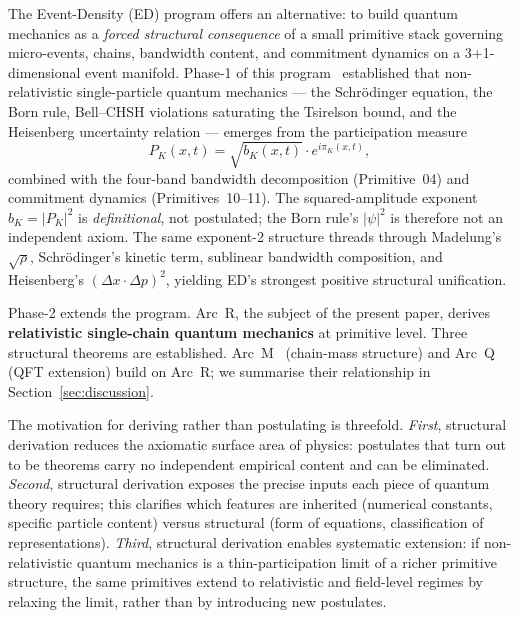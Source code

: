 \documentclass[11pt,a4paper]{article}
\begin{document}
The Event-Density (ED) program offers an alternative: to build quantum mechanics as a \emph{forced structural consequence} of a small primitive stack governing micro-events, chains, bandwidth content, and commitment dynamics on a 3+1-dimensional event manifold. Phase-1 of this program~\cite{phase1} established that non-relativistic single-particle quantum mechanics --- the Schr\"odinger equation, the Born rule, Bell--CHSH violations saturating the Tsirelson bound, and the Heisenberg uncertainty relation --- emerges from the participation measure
\begin{equation}
P_K(x, t) = \sqrt{b_K(x,t)} \cdot e^{i\pi_K(x,t)},
\end{equation}
combined with the four-band bandwidth decomposition (Primitive~04) and commitment dynamics (Primitives~10--11). The squared-amplitude exponent $b_K = |P_K|^2$ is \emph{definitional}, not postulated; the Born rule's $|\psi|^2$ is therefore not an independent axiom. The same exponent-2 structure threads through Madelung's $\sqrt{\rho}$, Schr\"odinger's kinetic term, sublinear bandwidth composition, and Heisenberg's $(\Delta x \cdot \Delta p)^2$, yielding ED's strongest positive structural unification.

Phase-2 extends the program. Arc~R, the subject of the present paper, derives \textbf{relativistic single-chain quantum mechanics} at primitive level. Three structural theorems are established. Arc~M~\cite{arcm} (chain-mass structure) and Arc~Q~\cite{arcq} (QFT extension) build on Arc~R; we summarise their relationship in Section~\ref{sec:discussion}.

The motivation for deriving rather than postulating is threefold. \emph{First}, structural derivation reduces the axiomatic surface area of physics: postulates that turn out to be theorems carry no independent empirical content and can be eliminated. \emph{Second}, structural derivation exposes the precise inputs each piece of quantum theory requires; this clarifies which features are inherited (numerical constants, specific particle content) versus structural (form of equations, classification of representations). \emph{Third}, structural derivation enables systematic extension: if non-relativistic quantum mechanics is a thin-participation limit of a richer primitive structure, the same primitives extend to relativistic and field-level regimes by relaxing the limit, rather than by introducing new postulates.
\end{document}
